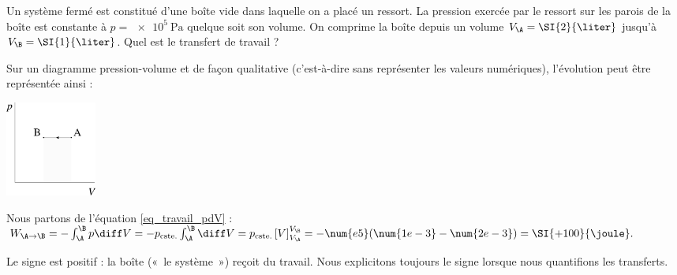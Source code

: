 \onlyframabook{\clearpage}
		\begin{anexample}
			
			Un système fermé est constitué d’une boîte vide dans laquelle on a placé un ressort. La pression exercée par le ressort sur les parois de la boîte est constante à $p = \SI{e5}{\pascal}$ quelque soit son volume. On comprime la boîte depuis un volume $V_\A = \SI{2}{\liter}$ jusqu’à $V_\B = \SI{1}{\liter}$. Quel est le transfert de travail ?
				\begin{answer}
						Sur un diagramme pression-volume et de façon qualitative (c’est-à-dire sans représenter les valeurs numériques), l’évolution peut être représentée ainsi :
							\begin{center}
								\includegraphics[width=3cm]{images/exe_pv_isobare.png}
							\end{center}
					Nous partons de l’équation \ref{eq_travail_pdV} : $W_{\A\to\B} = - \int_\A^\B p \diff V = - p_\text{cste.} \int_\A^\B \diff V = p_\text{cste.} \left[V\right]_{V_\A}^{V_\B } = - \num{e5} (\num{1e-3} - \num{2e-3}) = \SI{+100}{\joule}.$
					\begin{remark}Le signe est positif : la boîte («~le système~») reçoit du travail. Nous explicitons toujours le signe lorsque nous quantifions les transferts.\end{remark}
				\end{answer}
		\end{anexample}

